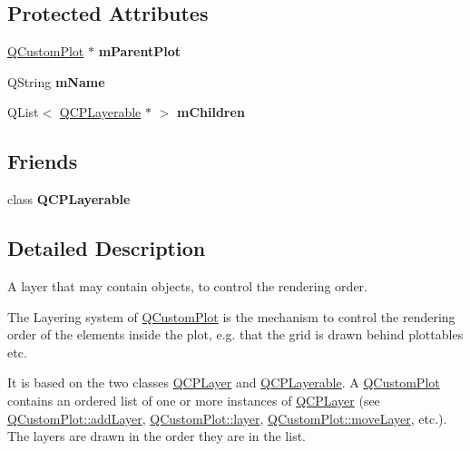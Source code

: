 \subsection*{Protected Attributes}
\begin{DoxyCompactItemize}
\item 
\hypertarget{classQCPLayer_a2f3374a7884bf403720cd1cf6f7ad1bb}{\hyperlink{classQCustomPlot}{Q\-Custom\-Plot} $\ast$ {\bfseries m\-Parent\-Plot}}\label{classQCPLayer_a2f3374a7884bf403720cd1cf6f7ad1bb}

\item 
\hypertarget{classQCPLayer_a91e6298183cb4b9dfd4efdfaf1ecc220}{Q\-String {\bfseries m\-Name}}\label{classQCPLayer_a91e6298183cb4b9dfd4efdfaf1ecc220}

\item 
\hypertarget{classQCPLayer_a704aa71bba469383c3a3c598c1ec0d28}{Q\-List$<$ \hyperlink{classQCPLayerable}{Q\-C\-P\-Layerable} $\ast$ $>$ {\bfseries m\-Children}}\label{classQCPLayer_a704aa71bba469383c3a3c598c1ec0d28}

\end{DoxyCompactItemize}
\subsection*{Friends}
\begin{DoxyCompactItemize}
\item 
\hypertarget{classQCPLayer_ad655f55cccf49ba14d5172ec517e07ae}{class {\bfseries Q\-C\-P\-Layerable}}\label{classQCPLayer_ad655f55cccf49ba14d5172ec517e07ae}

\end{DoxyCompactItemize}


\subsection{Detailed Description}
A layer that may contain objects, to control the rendering order. 

The Layering system of \hyperlink{classQCustomPlot}{Q\-Custom\-Plot} is the mechanism to control the rendering order of the elements inside the plot, e.\-g. that the grid is drawn behind plottables etc.

It is based on the two classes \hyperlink{classQCPLayer}{Q\-C\-P\-Layer} and \hyperlink{classQCPLayerable}{Q\-C\-P\-Layerable}. A \hyperlink{classQCustomPlot}{Q\-Custom\-Plot} contains an ordered list of one or more instances of \hyperlink{classQCPLayer}{Q\-C\-P\-Layer} (see \hyperlink{classQCustomPlot_ad5255393df078448bb6ac83fa5db5f52}{Q\-Custom\-Plot\-::add\-Layer}, \hyperlink{classQCustomPlot_aac492da01782820454e9136a8db28182}{Q\-Custom\-Plot\-::layer}, \hyperlink{classQCustomPlot_ae896140beff19424e9e9e02d6e331104}{Q\-Custom\-Plot\-::move\-Layer}, etc.). The layers are drawn in the order they are in the list.

